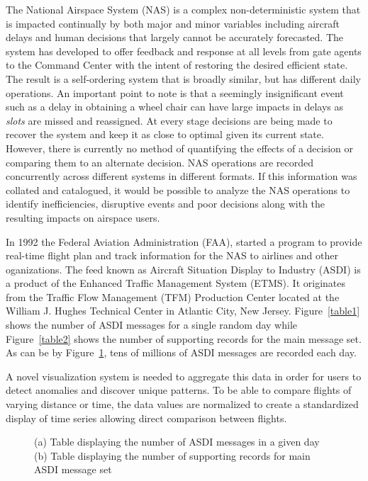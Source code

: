 \documentclass{sig-alternate}
\begin{document}
The National Airspace System (NAS) is a complex non-deterministic system that
is impacted continually by both major and minor variables including aircraft
delays and human decisions that largely cannot be accurately forecasted.
The system has developed to offer feedback and response at all levels from
gate agents to the Command Center with the intent of restoring the desired
efficient state. The result is a self-ordering system that is broadly
similar, but has different daily operations. An important point to note is that
a seemingly insignificant event such as
a delay in obtaining a wheel chair can have large impacts in delays
as \emph{slots} are missed and reassigned. At every stage decisions are being
made to recover the system and keep it as close to optimal given its current
state. However, there is currently no method of quantifying the effects of 
a decision or comparing them to an alternate decision. NAS operations
are recorded concurrently across different systems in different formats.
If this information was collated and catalogued, it would be possible
to analyze the NAS operations to identify inefficiencies, disruptive events 
and poor decisions along with the resulting impacts on airspace users.

In 1992 the Federal Aviation Administration (FAA), started a program to provide
real-time flight plan and track information for the NAS to airlines and other
oganizations. The feed known as Aircraft Situation Display to Industry (ASDI) is a 
product of the Enhanced Traffic Management System (ETMS). It originates from
the Traffic Flow Management (TFM) Production Center located at the William
J. Hughes Technical Center in Atlantic City, New Jersey. Figure~\ref{table1} shows the 
number of ASDI messages for a single random day while Figure~\ref{table2} shows the number
of supporting records for the main message set. As can be by Figure~\ref{two-tables},
tens of millions of ASDI messages are recorded each day.


A novel visualization system is needed to aggregate this data in order for 
users to detect anomalies and discover unique patterns. To be able to compare 
flights of varying distance or time, the data values are normalized to 
create a standardized display of time series allowing direct comparison between
flights. 

\newcommand{\incfig}[2]{\texttt{[image: figs/\#1]}\label{#1}}

\begin{figure}
\centering
\subfloat[]{\incfig{table1}{width=1\columnwidth}}\hfill
\subfloat[]{\incfig{table2}{width=1\columnwidth}}
\caption{
(a) Table displaying the number of ASDI messages in a given day
(b) Table displaying the number of supporting records for main ASDI message set
}
\label{two-tables}
\end{figure}
\end{document}
